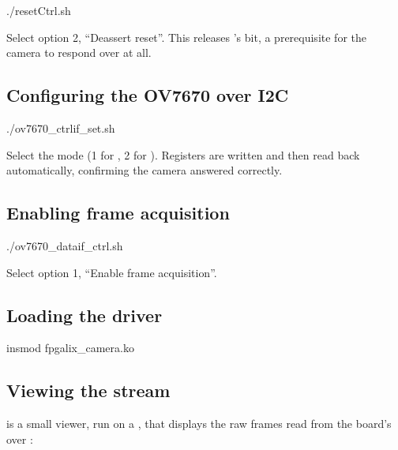 \begin{shellcodeboard}
./resetCtrl.sh
\end{shellcodeboard}

Select option 2, ``Deassert reset''. This releases 's  bit, a prerequisite for the camera to respond over  at all.

\subsection{Configuring the OV7670 over I2C}
\label{subsec:fpgalix-camera-i2c-config}

\begin{shellcodeboard}
./ov7670_ctrlif_set.sh
\end{shellcodeboard}

Select the  mode (1 for , 2 for ). Registers are written and then read back automatically, confirming the camera answered correctly.

\subsection{Enabling frame acquisition}
\label{subsec:fpgalix-camera-frame-acq}

\begin{shellcodeboard}
./ov7670_dataif_ctrl.sh
\end{shellcodeboard}

Select option 1, ``Enable frame acquisition''.

\subsection{Loading the driver}
\label{subsec:fpgalix-camera-load}

\begin{shellcodeboard}
insmod fpgalix_camera.ko
\end{shellcodeboard}

\subsection{Viewing the stream}
\label{subsec:fpgalix-camera-viewing}

 is a small  viewer, run on a , that displays the raw frames read from the board's  over :

